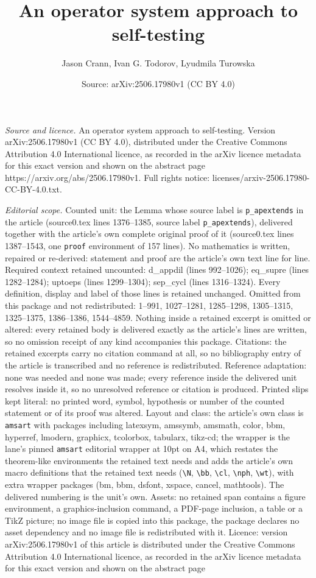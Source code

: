 \documentclass[10pt,a4paper]{amsart}
\title[An operator system approach to self-testing]{An operator system approach to self-testing}
\author{Jason Crann, Ivan G. Todorov, Lyudmila Turowska}
\date{Source: arXiv:2506.17980v1 (CC BY 4.0)}
\begin{document}
\maketitle

\noindent\emph{Source and licence.} An operator system approach to self-testing. Version arXiv:2506.17980v1 (CC BY 4.0), distributed under the Creative Commons Attribution 4.0 International licence, as recorded in the arXiv licence metadata for this exact version and shown on the abstract page https://arxiv.org/abs/2506.17980v1. Full rights notice: licenses/arxiv-2506.17980-CC-BY-4.0.txt.\par\smallskip

\noindent\textit{Editorial scope.} Counted unit: the Lemma whose source label is \texttt{p\_apextends} in the article (source0.tex lines 1376--1385, source label \texttt{p\_apextends}), delivered together with the article's own complete original proof of it (source0.tex lines 1387--1543, one \texttt{proof} environment of 157 lines). No mathematics is written, repaired or re-derived: statement and proof are the article's own text line for line. Required context retained uncounted: d\_appdil (lines 992--1026); eq\_supre (lines 1282--1284); uptoeps (lines 1299--1304); sep\_cycl (lines 1316--1324). Every definition, display and label of those lines is retained unchanged. Omitted from this package and not redistributed: 1--991, 1027--1281, 1285--1298, 1305--1315, 1325--1375, 1386--1386, 1544--4859. Nothing inside a retained excerpt is omitted or altered: every retained body is delivered exactly as the article's lines are written, so no omission receipt of any kind accompanies this package. Citations: the retained excerpts carry no citation command at all, so no bibliography entry of the article is transcribed and no reference is redistributed. Reference adaptation: none was needed and none was made; every reference inside the delivered unit resolves inside it, so no unresolved reference or citation is produced. Printed slips kept literal: no printed word, symbol, hypothesis or number of the counted statement or of its proof was altered. Layout and class: the article's own class is \texttt{amsart} with packages including latexsym, amssymb, amsmath, color, bbm, hyperref, lmodern, graphicx, tcolorbox, tabularx, tikz-cd; the wrapper is the lane's pinned \texttt{amsart} editorial wrapper at 10pt on A4, which restates the theorem-like environments the retained text needs and adds the article's own macro definitions that the retained text needs (\texttt{\textbackslash N}, \texttt{\textbackslash bb}, \texttt{\textbackslash cl}, \texttt{\textbackslash nph}, \texttt{\textbackslash wt}), with extra wrapper packages (bm, bbm, dsfont, xspace, cancel, mathtools). The delivered numbering is the unit's own. Assets: no retained span contains a figure environment, a graphics-inclusion command, a PDF-page inclusion, a table or a TikZ picture; no image file is copied into this package, the package declares no asset dependency and no image file is redistributed with it. Licence: version arXiv:2506.17980v1 of this article is distributed under the Creative Commons Attribution 4.0 International licence, as recorded in the arXiv licence metadata for this exact version and shown on the abstract page 
\end{document}
